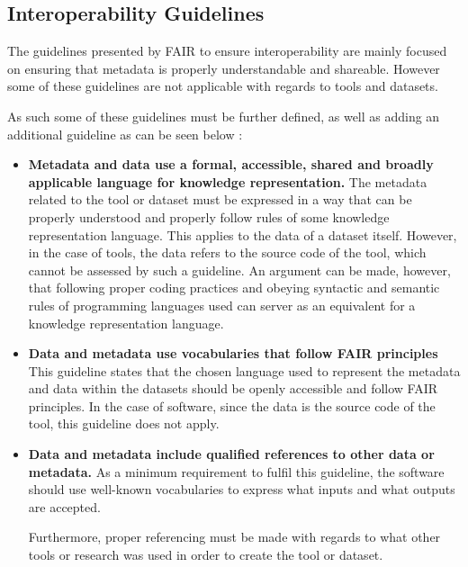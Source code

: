 \documentclass{cisfyp}
\begin{document}
\subsection{Interoperability Guidelines}
The guidelines presented by FAIR to ensure interoperability are mainly focused on ensuring that metadata is properly understandable and shareable. However some of these guidelines are not applicable with regards to tools and datasets. 

As such some of these guidelines must be further defined, as well as adding an additional guideline as can be seen below \cite{dbcls}:
\begin{itemize}
	\item \textbf{Metadata and data use a formal, accessible, shared and broadly applicable language for knowledge representation.}\newline
	The metadata related to the tool or dataset must be expressed in a way that can be properly understood and properly follow rules of some knowledge representation language. This applies to the data of a dataset itself. However, in the case of tools, the data refers to the source code of the tool, which cannot be assessed by such a guideline. An argument can be made, however, that following proper coding practices and obeying syntactic and semantic rules of programming languages used can server as an equivalent for a knowledge representation language. \cite{dbcls}
	
	\item \textbf{Data and metadata use vocabularies that follow FAIR principles}\newline
	This guideline states that the chosen language used to represent the metadata and data within the datasets should be openly accessible and follow FAIR principles. In the case of software, since the data is the source code of the tool, this guideline does not apply.
	
	\item \textbf{Data and metadata include qualified references to other data or metadata.}\newline
	As a minimum requirement to fulfil this guideline, the software should use well-known vocabularies to express what inputs and what outputs are accepted.
	
	Furthermore, proper referencing must be made with regards to what other tools or research was used in order to create the tool or dataset.
\end{itemize}
\end{document}

